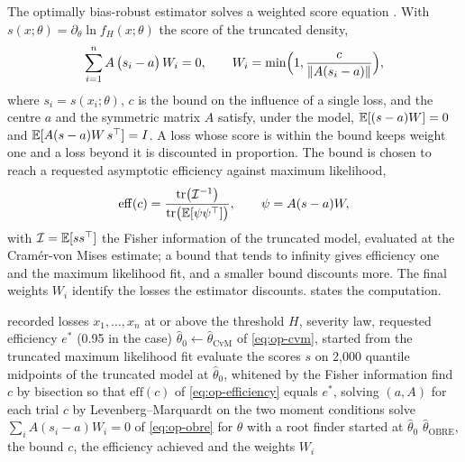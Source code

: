 The optimally bias-robust estimator solves a weighted score equation \citep{oprisk:hampel1986}. With $s(x;\theta)=\partial_\theta\ln f_H(x;\theta)$ the
score of the truncated density,
\begin{equation}
\sum_{i=1}^{n}A\,\bigl(s_i-a\bigr)\,W_i=0,\qquad W_i=\min\Bigl(1,\frac{c}{\lVert A(s_i-a)\rVert}\Bigr),
\label{eq:op-obre}
\end{equation}
where $s_i=s(x_i;\theta)$, $c$ is the bound on the influence of a single loss, and the centre $a$ and the symmetric matrix $A$ satisfy, under the
model, $\mathbb{E}[(s-a)W]=0$ and $\mathbb{E}[A(s-a)W\,s^{\top}]=I$. A loss whose score is within the bound keeps weight one and a loss beyond it is
discounted in proportion. The bound is chosen to reach a requested asymptotic efficiency against maximum likelihood,
\begin{equation}
\mathrm{eff}(c)=\frac{\operatorname{tr}\bigl(\mathcal{I}^{-1}\bigr)}{\operatorname{tr}\bigl(\mathbb{E}[\psi\psi^{\top}]\bigr)},\qquad \psi=A(s-a)W,
\label{eq:op-efficiency}
\end{equation}
with $\mathcal{I}=\mathbb{E}[ss^{\top}]$ the Fisher information of the truncated model, evaluated at the Cram\'er-von Mises estimate; a bound that tends to infinity gives
efficiency one and the maximum likelihood fit, and a smaller bound discounts more. The final weights $W_i$ identify the losses the estimator
discounts.  states the computation.

\begin{algorithm}[htbp]
\caption{Optimally bias-robust fit of a truncated severity at a requested efficiency}
\label{alg:op-obre}
\begin{algorithmic}[1]
\Require recorded losses $x_1,\dots,x_n$ at or above the threshold $H$, severity law, requested efficiency $e^\ast$ (0.95 in the case)
\State $\hat\theta_0\leftarrow\hat\theta_{\mathrm{CvM}}$ of \cref{eq:op-cvm}, started from the truncated maximum likelihood fit
\State evaluate the scores $s$ on 2,000 quantile midpoints of the truncated model at $\hat\theta_0$, whitened by the Fisher information
\State find $c$ by bisection so that $\mathrm{eff}(c)$ of \cref{eq:op-efficiency} equals $e^\ast$, solving $(a,A)$ for each trial $c$ by Levenberg--Marquardt on the two moment conditions
\State solve $\sum_i A(s_i-a)W_i=0$ of \cref{eq:op-obre} for $\theta$ with a root finder started at $\hat\theta_0$
\State \Return $\hat\theta_{\mathrm{OBRE}}$, the bound $c$, the efficiency achieved and the weights $W_i$
\end{algorithmic}
\end{algorithm}

